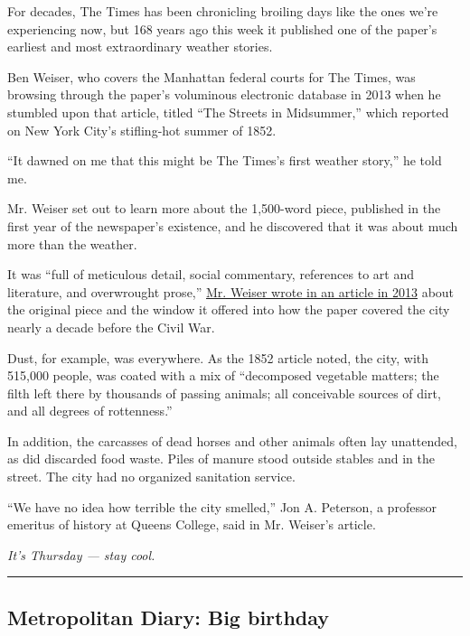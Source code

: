 For decades, The Times has been chronicling broiling days like the ones
we're experiencing now, but 168 years ago this week it published one of
the paper's earliest and most extraordinary weather stories.

Ben Weiser, who covers the Manhattan federal courts for The Times, was
browsing through the paper's voluminous electronic database in 2013 when
he stumbled upon that article, titled ``The Streets in Midsummer,''
which reported on New York City's stifling-hot summer of 1852.

``It dawned on me that this might be The Times's first weather story,''
he told me.

Mr. Weiser set out to learn more about the 1,500-word piece, published
in the first year of the newspaper's existence, and he discovered that
it was about much more than the weather.

It was ``full of meticulous detail, social commentary, references to art
and literature, and overwrought prose,''
\href{https://archive.nytimes.com/www.nytimes.com/interactive/2013/07/28/nyregion/heat-struck-july-1852.html}{Mr.
Weiser wrote in an article in 2013} about the original piece and the
window it offered into how the paper covered the city nearly a decade
before the Civil War.

Dust, for example, was everywhere. As the 1852 article noted, the city,
with 515,000 people, was coated with a mix of ``decomposed vegetable
matters; the filth left there by thousands of passing animals; all
conceivable sources of dirt, and all degrees of rottenness.''

In addition, the carcasses of dead horses and other animals often lay
unattended, as did discarded food waste. Piles of manure stood outside
stables and in the street. The city had no organized sanitation service.

``We have no idea how terrible the city smelled,'' Jon A. Peterson, a
professor emeritus of history at Queens College, said in Mr. Weiser's
article.

\emph{It's Thursday --- stay cool.}

\begin{center}\rule{0.5\linewidth}{\linethickness}\end{center}

\hypertarget{metropolitan-diary-big-birthday}{%
\subsection{Metropolitan Diary: Big
birthday}\label{metropolitan-diary-big-birthday}}

